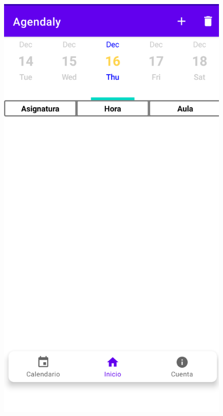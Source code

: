 \documentclass[a4paper,openright,12pt]{article}
\begin{document}
\begin{figure}
            \includegraphics[scale=0.05]{Horario.png} 

\end{figure}
\end{document}
